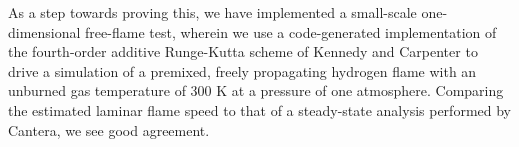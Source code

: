 As a step towards proving this, we have implemented a small-scale one-dimensional
free-flame test, wherein we use a code-generated implementation of the fourth-order
additive Runge-Kutta scheme of Kennedy and Carpenter to drive a simulation of
a premixed, freely propagating hydrogen flame with an unburned gas temperature
of 300 K at a pressure of one atmosphere. Comparing the estimated laminar
flame speed to that of a steady-state analysis performed by Cantera, we see
good agreement.

